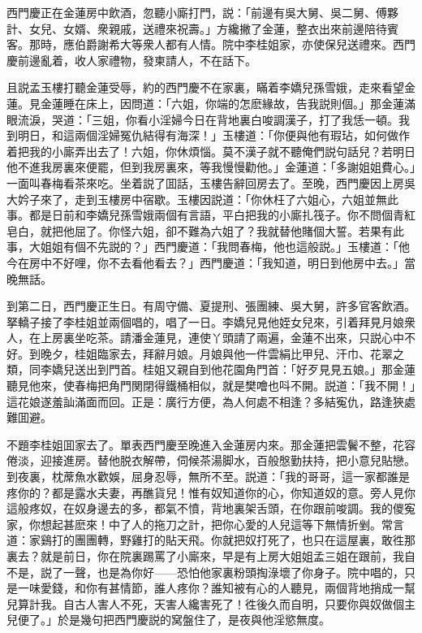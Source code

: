 西門慶正在金蓮房中飲酒，忽聽小廝打門，説：「前邊有吳大舅、吳二舅、傅夥計、女兒、女婿、衆親戚，送禮來祝壽。」方纔撇了金蓮，整衣出來前邊陪待賓客。那時，應伯爵謝希大等衆人都有人情。院中李桂姐家，亦使保兒送禮來。西門慶前邊亂着，收人家禮物，發柬請人，不在話下。

且説孟玉樓打聽金蓮受辱，約的西門慶不在家裏，瞞着李嬌兒孫雪娥，走來看望金蓮。見金蓮睡在床上，因問道：「六姐，你端的怎麽緣故，告我説則個。」那金蓮滿眼流淚，哭道：「三姐，你看小淫婦今日在背地裏白唆調漢子，打了我恁一頓。我到明日，和這兩個淫婦冤仇結得有海深！」玉樓道：「你便與他有瑕玷，如何做作着把我的小廝弄出去了！六姐，你休煩惱。莫不漢子就不聽俺們説句話兒？若明日他不進我房裏來便罷，但到我房裏來，等我慢慢勸他。」金蓮道：「多謝姐姐費心。」一面叫春梅看茶來吃。坐着説了囬話，玉樓告辭回房去了。至晚，西門慶因上房吳大妗子來了，走到玉樓房中宿歇。玉樓因説道：「你休枉了六姐心，六姐並無此事。都是日前和李嬌兒孫雪娥兩個有言語，平白把我的小廝扎筏子。你不問個青紅皂白，就把他屈了。你怪六姐，卻不難為六姐了？我就替他賭個大誓。若果有此事，大姐姐有個不先説的？」西門慶道：「我問春梅，他也這般説。」玉樓道：「他今在房中不好哩，你不去看他看去？」西門慶道：「我知道，明日到他房中去。」當晚無話。

到第二日，西門慶正生日。有周守備、夏提刑、張團練、吳大舅，許多官客飲酒。拏轎子接了李桂姐並兩個唱的，唱了一日。李嬌兒見他姪女兒來，引着拜見月娘衆人，在上房裏坐吃茶。請潘金蓮見，連使丫頭請了兩遍，金蓮不出來，只説心中不好。到晚夕，桂姐臨家去，拜辭月娘。月娘與他一件雲絹比甲兒、汗巾、花翠之類，同李嬌兒送出到門首。桂姐又親自到他花園角門首：「好歹見見五娘。」那金蓮聽見他來，使春梅把角門関閉得鐵桶相似，就是樊噲也呌不開。説道：「我不開！」這花娘遂羞訕滿面而回。正是：廣行方便，為人何處不相逢？多結寃仇，路逢狹處難囬避。

不題李桂姐囬家去了。單表西門慶至晚進入金蓮房内來。那金蓮把雲鬢不整，花容倦淡，迎接進房。替他脱衣解帶，伺候茶湯脚水，百般慇勤扶持，把小意兒貼戀。到夜裏，枕蓆魚水歡娛，屈身忍辱，無所不至。説道：「我的哥哥，這一家都誰是疼你的？都是露水夫妻，再醮貨兒！惟有奴知道你的心，你知道奴的意。旁人見你這般疼奴，在奴身邊去的多，都氣不憤，背地裏架舌頭，在你跟前唆調。我的儍寃家，你想起甚麽來！中了人的拖刀之計，把你心愛的人兒這等下無情折剉。常言道：家鷄打的團團轉，野雞打的貼天飛。你就把奴打死了，也只在這屋裏，敢徃那裏去？就是前日，你在院裏踢罵了小廝來，早是有上房大姐姐孟三姐在跟前，我自不是，説了一聲，也是為你好——恐怕他家裏粉頭掏淥壞了你身子。院中唱的，只是一味愛錢，和你有甚情節，誰人疼你？誰知被有心的人聽見，兩個背地捎成一幫兒算計我。自古人害人不死，天害人纔害死了！徃後久而自明，只要你與奴做個主兒便了。」於是幾句把西門慶説的窝盤住了，是夜與他淫慾無度。

